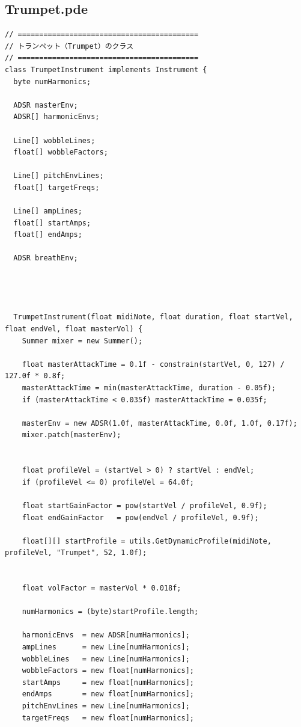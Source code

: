 \subsection{Trumpet.pde}
\begin{lstlisting}[caption={Trumpet.pde}, label={lst:proc_trumpet}]
// ==========================================
// トランペット（Trumpet）のクラス
// ==========================================
class TrumpetInstrument implements Instrument {
  byte numHarmonics;
  
  ADSR masterEnv;
  ADSR[] harmonicEnvs;
  
  Line[] wobbleLines;
  float[] wobbleFactors;
  
  Line[] pitchEnvLines;
  float[] targetFreqs;
  
  Line[] ampLines;
  float[] startAmps;
  float[] endAmps;
  
  ADSR breathEnv;
  
  
  
  
  TrumpetInstrument(float midiNote, float duration, float startVel, float endVel, float masterVol) {
    Summer mixer = new Summer();
    
    float masterAttackTime = 0.1f - constrain(startVel, 0, 127) / 127.0f * 0.8f;
    masterAttackTime = min(masterAttackTime, duration - 0.05f);
    if (masterAttackTime < 0.035f) masterAttackTime = 0.035f;
    
    masterEnv = new ADSR(1.0f, masterAttackTime, 0.0f, 1.0f, 0.17f);
    mixer.patch(masterEnv);
    
    
    float profileVel = (startVel > 0) ? startVel : endVel;
    if (profileVel <= 0) profileVel = 64.0f;
    
    float startGainFactor = pow(startVel / profileVel, 0.9f);
    float endGainFactor   = pow(endVel / profileVel, 0.9f);
    
    float[][] startProfile = utils.GetDynamicProfile(midiNote, profileVel, "Trumpet", 52, 1.0f);
    
    
    float volFactor = masterVol * 0.018f;
    
    numHarmonics = (byte)startProfile.length;
    
    harmonicEnvs  = new ADSR[numHarmonics];
    ampLines      = new Line[numHarmonics];
    wobbleLines   = new Line[numHarmonics];
    wobbleFactors = new float[numHarmonics];
    startAmps     = new float[numHarmonics];
    endAmps       = new float[numHarmonics];
    pitchEnvLines = new Line[numHarmonics];
    targetFreqs   = new float[numHarmonics];
    

\end{lstlisting}
